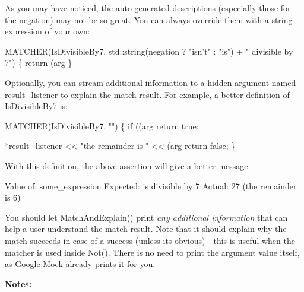 As you may have noticed, the auto-\/generated descriptions (especially those for the negation) may not be so great. You can always override them with a string expression of your own\+: 
\begin{DoxyCode}
MATCHER(IsDivisibleBy7, std::string(negation ? \textcolor{stringliteral}{"isn't"} : \textcolor{stringliteral}{"is"}) +
                        \textcolor{stringliteral}{" divisible by 7"}) \{
  \textcolor{keywordflow}{return} (arg %
\}
\end{DoxyCode}


Optionally, you can stream additional information to a hidden argument named {\ttfamily result\+\_\+listener} to explain the match result. For example, a better definition of {\ttfamily Is\+Divisible\+By7} is\+: 
\begin{DoxyCode}
MATCHER(IsDivisibleBy7, \textcolor{stringliteral}{""}) \{
  \textcolor{keywordflow}{if} ((arg %
    \textcolor{keywordflow}{return} \textcolor{keyword}{true};

  *result\_listener << \textcolor{stringliteral}{"the remainder is "} << (arg %
  \textcolor{keywordflow}{return} \textcolor{keyword}{false};
\}
\end{DoxyCode}


With this definition, the above assertion will give a better message\+: 
\begin{DoxyCode}
Value of: some\_expression
Expected: is divisible by 7
  Actual: 27 (the remainder is 6)
\end{DoxyCode}


You should let {\ttfamily Match\+And\+Explain()} print {\itshape any additional information} that can help a user understand the match result. Note that it should explain why the match succeeds in case of a success (unless it\textquotesingle{}s obvious) -\/ this is useful when the matcher is used inside {\ttfamily Not()}. There is no need to print the argument value itself, as Google \hyperlink{classMock}{Mock} already prints it for you.

{\bfseries Notes\+:}


